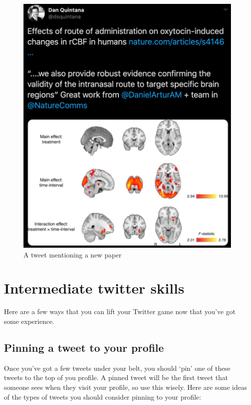 \documentclass[]{book}
\begin{document}
\begin{figure}

{\centering \includegraphics[width=0.8\linewidth]{images/paper_mention} 

}

\caption{A tweet mentioning a new paper}\label{fig:paper-mention}
\end{figure}

\hypertarget{intermediate-twitter-skills}{%
\chapter{Intermediate twitter skills}\label{intermediate-twitter-skills}}

Here are a few ways that you can lift your Twitter game now that you've got some experience.

\hypertarget{pinning-a-tweet-to-your-profile}{%
\section{Pinning a tweet to your profile}\label{pinning-a-tweet-to-your-profile}}

Once you've got a few tweets under your belt, you should `pin' one of these tweets to the top of you profile. A pinned tweet will be the first tweet that someone sees when they visit your profile, so use this wisely. Here are some ideas of the types of tweets you should consider pinning to your profile:
\end{document}
